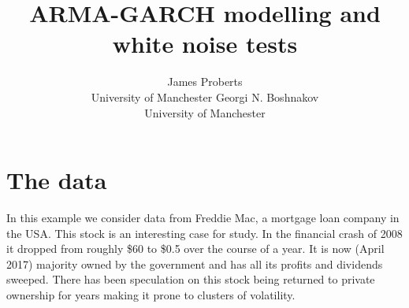 \documentclass[article,nojss]{jss}
\author{James Proberts\\University of Manchester \And
        Georgi N. Boshnakov \\ University of Manchester
}
\title{ARMA-GARCH modelling and white noise tests}
\begin{document}











\section{The data}

In this example we consider data from Freddie Mac, a mortgage loan company in
the USA. This stock is an interesting case for study. In the financial crash of
2008 it dropped from roughly \$60 to \$0.5 over the course of a year. It is now
(April 2017) majority owned by the government and has all its profits and
dividends sweeped. There has been speculation on this stock being returned to
private ownership for years making it prone to clusters of volatility.
\end{document}
